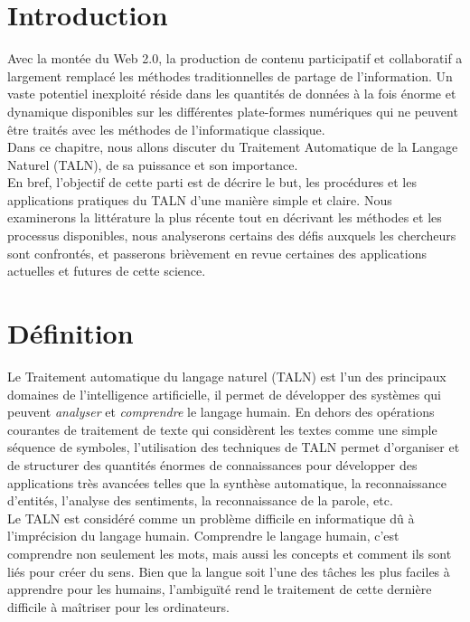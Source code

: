 
\newpage

\section{Introduction}
Avec la montée du Web 2.0, la production de contenu participatif et collaboratif a largement remplacé les méthodes traditionnelles de partage de l'information. Un vaste potentiel inexploité réside dans les quantités de données à la fois énorme et dynamique disponibles sur les différentes plate-formes numériques qui ne peuvent être traités avec les méthodes de l'informatique classique.\\
Dans ce chapitre, nous allons discuter du Traitement Automatique de la Langage Naturel (TALN), de sa puissance et son importance.\\ 
En bref, l'objectif de cette parti est de décrire le but, les procédures et les applications pratiques du TALN d'une manière simple et claire. Nous examinerons la littérature la plus récente tout en décrivant les méthodes et les processus disponibles, nous analyserons certains des défis auxquels les chercheurs sont confrontés, et passerons brièvement en revue certaines des applications actuelles et futures de cette science.

\section{Définition}
Le Traitement automatique du langage naturel (TALN) est l'un des principaux domaines de l'intelligence artificielle, il permet de développer des systèmes qui peuvent \emph{analyser} et \emph{comprendre} le langage humain. En dehors des opérations courantes de traitement de texte qui considèrent les textes comme une simple séquence de symboles, l'utilisation des techniques de TALN permet d'organiser et de structurer des quantités énormes de connaissances pour développer des applications très avancées telles que la synthèse automatique, la reconnaissance d'entités, l'analyse des sentiments, la reconnaissance de la parole, etc.\\
Le TALN est considéré comme un problème difficile en informatique dû à l'imprécision du langage humain. Comprendre le langage humain, c'est comprendre non seulement les mots, mais aussi les concepts et comment ils sont liés pour créer du sens. Bien que la langue soit l'une des tâches les plus faciles à apprendre pour les humains, l'ambiguïté rend le traitement de cette dernière difficile à maîtriser pour les ordinateurs.

